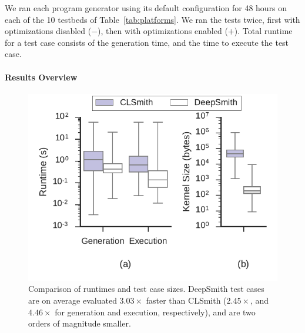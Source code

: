 We ran each program generator using its default configuration for 48 hours on each of the 10 testbeds of Table~\ref{tab:platforms}. We ran the tests twice, first with optimizations disabled ($-$), then with optimizations enabled ($+$). Total runtime for a test case consists of the generation time, and the time to execute the test case.


\paragraph{Results Overview}

\begin{table}
  \scriptsize %
  \centering %
  
  \caption{%
    Results from 48 hours of testing using CLSmith and DeepSmith. Testbed \#. as per Table~\ref{tab:platforms}. $\pm$ denotes optimizations off ($-$) vs on ($+$). The remaining columns denote the number of build crash (\textbf{bc}), build timeout (\textbf{bto}), build failure (\textbf{bf}), runtime crash (\textbf{c}), timeout (\textbf{to}), and pass (\textbf{\cmark}) results. %
  }
  \label{tab:megatable}
\end{table}

\begin{figure}
  \centering %
  \includegraphics[width=\columnwidth]{build/img/vs-clsmith}%
  \vspace{-1em}
  \caption{%
    Comparison of runtimes and test case sizes. DeepSmith test cases are on average evaluated $3.03\times$ faster than CLSmith ($2.45\times$, and $4.46\times$ for generation and execution, respectively), and are two orders of magnitude smaller.
  }%
  \label{fig:vs-clsmith} %
\end{figure}

